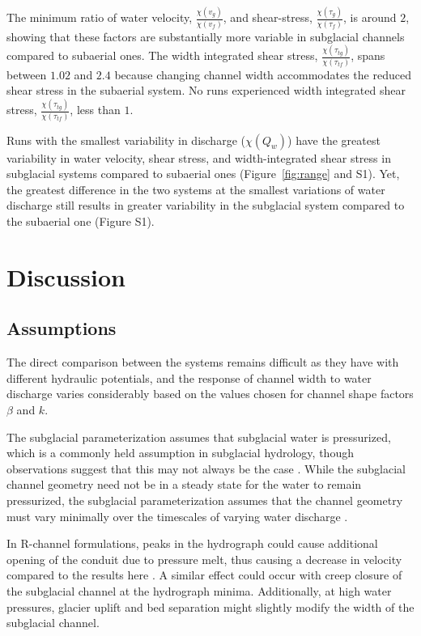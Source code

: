 \documentclass[11pt]{article}
\begin{document}
\begin{spacing}{1}
  The minimum ratio of  water velocity, $\frac{\chi(v_{g})}{\chi(v_{f})}$, and shear-stress, $\frac{\chi(\tau_{g})}{\chi(\tau_{f})}$, is around $2$, showing that these factors are substantially more variable in subglacial channels compared to subaerial ones.
  The width integrated shear stress, $\frac{\chi(\tau_{tg})}{\chi( \tau_{tf})}$, spans between $1.02$ and $2.4$ because changing channel width accommodates the reduced shear stress in the subaerial system.
  No runs experienced width integrated shear stress, $\frac{\chi(\tau_{tg})}{\chi( \tau_{tf})}$, less than $1$.
  
  Runs with the smallest variability in discharge ($\chi(Q_w)$) have the greatest variability in water velocity, shear stress, and width-integrated shear stress in subglacial systems compared to subaerial ones (Figure~\ref{fig:range} and S1).
  Yet, the greatest difference in the two systems at the smallest variations of water discharge still results in greater variability in the subglacial system compared to the subaerial one (Figure S1). 

  
  \section{Discussion}
  \subsection{Assumptions}
  
  The direct comparison between the systems remains difficult as they have with different hydraulic potentials, and the response of channel width to water discharge varies considerably based on the values chosen for channel shape factors $\beta$ and $k$.
  
  The subglacial parameterization assumes that subglacial water is pressurized, which is a commonly held assumption in subglacial hydrology, though observations suggest that this may not always be the case \citep[e.g.][]{gimbert2016}.
  While the subglacial channel geometry need not be in a steady state for the water to remain pressurized, the subglacial parameterization assumes that the channel geometry must vary minimally over the timescales of varying  water discharge \citep[e.g.][]{nanni2020}.
  
  In R-channel formulations, peaks in the hydrograph could cause additional opening of the conduit due to pressure melt, thus causing a decrease in velocity compared to the results here \citep{rothlisberger1972}.
  A similar effect could occur with creep closure of the subglacial channel at the hydrograph minima.
  Additionally, at high water pressures, glacier uplift and bed separation \citep{andrews2014} might slightly modify the width of the subglacial channel. 


\end{spacing}
\end{document}

